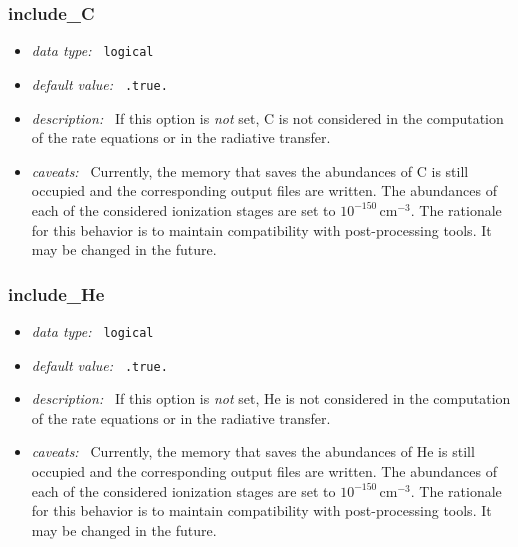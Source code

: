 \documentclass[a4paper,10pt]{article}
\begin{document}
\subsubsection{include\_C}
\label{opt:includec}
\begin{itemize}
 \item \textit{data type:~} \texttt{logical}
 \item \textit{default value:~} \texttt{.true.}
 \item \textit{description:~} If this option is 
 \textit{not} set, C is not considered 
 in the computation of the rate equations or in the
 radiative transfer. 
 \item \textit{caveats:~} Currently, the memory that saves the 
 abundances of C is still occupied and the corresponding output
 files are written. The abundances of each of the considered ionization
 stages are set to $10^{-150}\,\mathrm{cm^{-3}}$. The rationale for
 this behavior is to maintain compatibility with post-processing
 tools. It may be changed in the future.
\end{itemize}

\subsubsection{include\_He}
\label{opt:includehe}
\begin{itemize}
 \item \textit{data type:~} \texttt{logical}
 \item \textit{default value:~} \texttt{.true.}
 \item \textit{description:~} If this option is 
 \textit{not} set, He is not considered 
 in the computation of the rate equations or in the
 radiative transfer. 
 \item \textit{caveats:~} Currently, the memory that saves the 
 abundances of He is still occupied and the corresponding output
 files are written. The abundances of each of the considered ionization
 stages are set to $10^{-150}\,\mathrm{cm^{-3}}$. The rationale for
 this behavior is to maintain compatibility with post-processing
 tools. It may be changed in the future.
\end{itemize}
\end{document}
